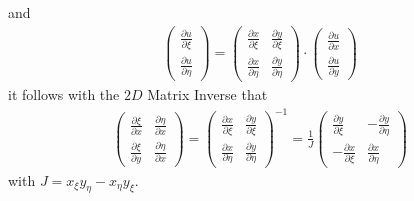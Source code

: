 \documentclass[11pt]{scrartcl}
\begin{document}
and 
\begin{align*}
\begin{pmatrix}
\frac{\partial u}{\partial \xi} \\
\frac{\partial u}{\partial \eta}
\end{pmatrix} =
\begin{pmatrix}
\frac{\partial x}{\partial \xi} & \frac{\partial y}{\partial \xi}\\
\frac{\partial x}{\partial \eta} & \frac{\partial y}{\partial \eta}
\end{pmatrix} \cdot
\begin{pmatrix}
\frac{\partial u}{\partial x} \\
\frac{\partial u}{\partial y}
\end{pmatrix}
\end{align*}
it follows with the $2D$ Matrix Inverse that
\begin{align*}
\begin{pmatrix}
\frac{\partial \xi}{\partial x} & \frac{\partial \eta}{\partial x}\\
\frac{\partial \xi}{\partial y} & \frac{\partial \eta}{\partial x}
\end{pmatrix} =
\begin{pmatrix}
\frac{\partial x}{\partial \xi} & \frac{\partial y}{\partial \xi}\\
\frac{\partial x}{\partial \eta} & \frac{\partial y}{\partial \eta}
\end{pmatrix}^{-1} =
\frac{1}{J}
\begin{pmatrix}
\frac{\partial y}{\partial \xi} & -\frac{\partial y}{\partial \eta}\\
-\frac{\partial x}{\partial \xi} & \frac{\partial x}{\partial \eta}
\end{pmatrix}
\end{align*}
with $J= x_\xi y_\eta - x_\eta y_\xi $.
\end{document}
